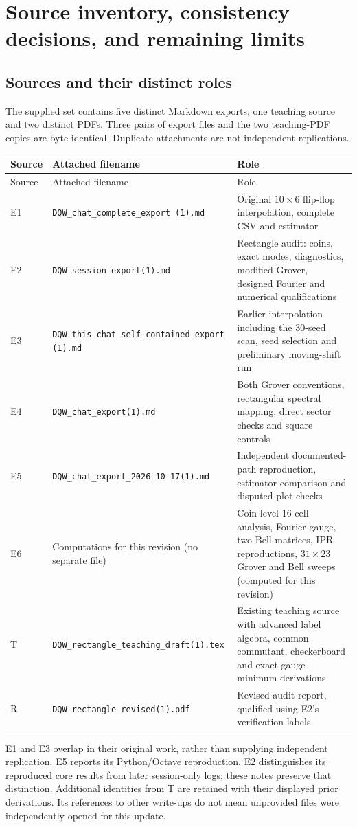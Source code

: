 \documentclass[11pt,a4paper,oneside]{report}
\numberwithin{equation}{chapter}
\begin{document}
\chapter{Source inventory, consistency decisions, and remaining limits}
\label{app:sources}

\section{Sources and their distinct roles}

The supplied set contains five distinct Markdown exports, one teaching
source and two distinct PDFs. Three pairs of export files and the two
teaching-PDF copies are byte-identical. Duplicate attachments are not
independent replications.
\begin{longtable}{@{}>{\raggedright\arraybackslash}p{}>{\raggedright\arraybackslash}p{}>{\raggedright\arraybackslash}p{}@{}}
\toprule Source & Attached filename & Role\\\midrule\endfirsthead
\toprule Source & Attached filename & Role\\\midrule\endhead
E1 & \nolinkurl{DQW_chat_complete_export (1).md}
& Original \(10\times6\) flip-flop interpolation, complete CSV and estimator\\
E2 & \nolinkurl{DQW_session_export(1).md}
& Rectangle audit: coins, exact modes, diagnostics, modified Grover, designed Fourier and numerical qualifications\\
E3 & \nolinkurl{DQW_this_chat_self_contained_export (1).md}
& Earlier interpolation including the 30-seed scan, seed selection and preliminary moving-shift run\\
E4 & \nolinkurl{DQW_chat_export(1).md}
& Both Grover conventions, rectangular spectral mapping, direct sector checks and square controls\\
E5 & \nolinkurl{DQW_chat_export_2026-10-17(1).md}
& Independent documented-path reproduction, estimator comparison and disputed-plot checks\\
E6 & Computations for this revision (no separate file)
& Coin-level 16-cell analysis, Fourier gauge, two Bell matrices, IPR reproductions, \(31\times23\) Grover and Bell sweeps (computed for this revision)\\
T & \nolinkurl{DQW_rectangle_teaching_draft(1).tex}
& Existing teaching source with advanced label algebra, common commutant, checkerboard and exact gauge-minimum derivations\\
R & \nolinkurl{DQW_rectangle_revised(1).pdf}
& Revised audit report, qualified using E2's verification labels\\\bottomrule
\end{longtable}
E1 and E3 overlap in their original work, rather than supplying independent
replication. E5 reports its Python/Octave reproduction. E2 distinguishes
its reproduced core results from later session-only logs; these notes
preserve that distinction. Additional identities from T are retained with
their displayed prior derivations. Its references to other write-ups do
not mean unprovided files were independently opened for this update.
\end{document}

